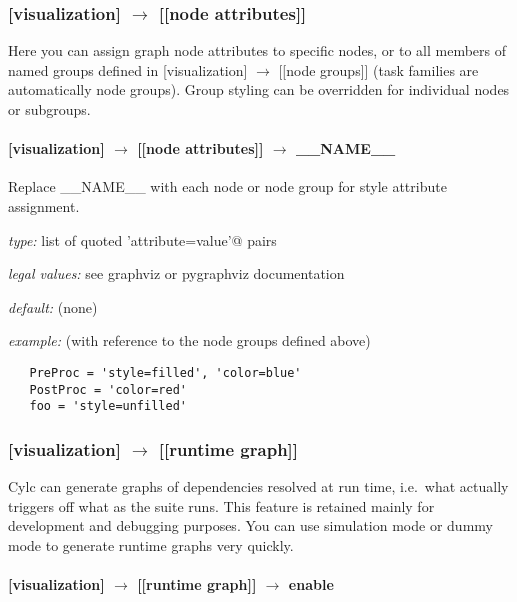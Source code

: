 \subsubsection[{[[}node attributes{]]}]{[visualization] $\rightarrow$ [[node attributes]]}

Here you can assign graph node attributes to specific nodes, or to all
members of named groups defined in [visualization] $\rightarrow$ [[node
groups]] (task families are automatically node groups). Group styling 
can be overridden for individual nodes or subgroups.

\paragraph[\_\_NAME\_\_]{[visualization] $\rightarrow$ [[node attributes]] $\rightarrow$ \_\_NAME\_\_}

Replace \_\_NAME\_\_ with each node or node group for style attribute
assignment.

\begin{myitemize}
    \item {\em type:} list of quoted \lstinline@'attribute=value'@ pairs
    \item {\em legal values:} see graphviz or pygraphviz documentation
    \item {\em default:} (none)
    \item {\em example:} (with reference to the node groups defined above)
\begin{lstlisting}
   PreProc = 'style=filled', 'color=blue'
   PostProc = 'color=red'
   foo = 'style=unfilled'
\end{lstlisting}
\end{myitemize}

\subsubsection[{[[}runtime graph{]]}]{[visualization] $\rightarrow$ [[runtime graph]]}

Cylc can generate graphs of dependencies resolved at run time, i.e.\ what 
actually triggers off what as the suite runs. This feature is retained
mainly for development and debugging purposes. You can use simulation
mode or dummy mode to generate runtime graphs very quickly.

\paragraph[enable]{[visualization] $\rightarrow$ [[runtime graph]] $\rightarrow$ enable}

